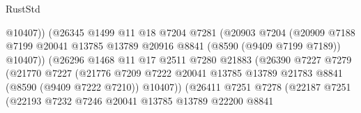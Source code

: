 \begin{lexlean}{RustStd}
\begin{coremodule}
                                      @10407))
                                  (@26345
                                    @1499
                                    @11
                                    @18
                                    @7204
                                    @7281
                                    (@20903
                                      @7204
                                      (@20909
                                        @7188
                                        @7199
                                        @20041
                                        @13785
                                        @13789
                                        @20916
                                        @8841
                                        (@8590 (@9409 @7199 @7189))
                                        @10407))
                                    (@26296
                                      @1468
                                      @11
                                      @17
                                      @2511
                                      @7280
                                      @21883
                                      (@26390
                                        @7227
                                        @7279
                                        (@21770
                                          @7227
                                          (@21776
                                            @7209
                                            @7222
                                            @20041
                                            @13785
                                            @13789
                                            @21783
                                            @8841
                                            (@8590 (@9409 @7222 @7210))
                                            @10407))
                                        (@26411
                                          @7251
                                          @7278
                                          (@22187
                                            @7251
                                            (@22193
                                              @7232
                                              @7246
                                              @20041
                                              @13785
                                              @13789
                                              @22200
                                              @8841

\end{coremodule}
\end{lexlean}
